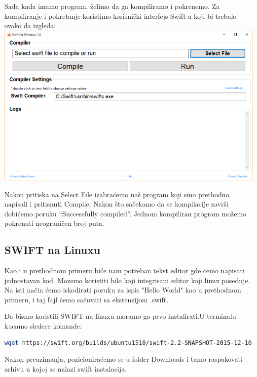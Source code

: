 \documentclass[a4paper]{article}
\begin{document}
Sada kada imamo program, želimo da ga kompiliramo i pokrenemo. Za kompiliranje i pokretanje koristimo korisnički interfejs Swift-a koji bi trebalo ovako da izgleda:\\

\includegraphics[scale=0.4]{swift-win.png}
\vspace{3mm}

Nakon pritiska na Select File izabraćemo naš program koji smo prethodno napisali i pritisnuti Compile. Nakon što sačekamo da se kompilacije završi dobićemo poruku “Successfully compiled”.
Jednom kompiliran program možemo pokrenuti neograničen broj puta.

\subsection{SWIFT na Linuxu}
\label{subsec:podnaslovLinux}

Kao i u prethodnom primeru biće nam potreban tekst editor gde cemo napisati jednostavan kod.
Mozemo koristiti bilo koji integrisani editor koji linux poseduje. Na isti način ćemo iskodirati poruku za ispis "Hello World" kao u prethodnom primeru, i taj fajl ćemo sačuvati sa ekstenzijom .swift.

Da bismo koristili SWIFT na linuxu moramo ga prvo instalirati.U terminalu kucamo sledece komande:

\begin{lstlisting}[language=bash]
	wget https://swift.org/builds/ubuntu1510/swift-2.2-SNAPSHOT-2015-12-10-a/swift-2.2-SNAPSHOT-2015-12-10-a-ubuntu15.10.tar.gz

\end{lstlisting}
Nakon preuzimanja, pozicioniraćemo se u folder Downloads i tamo raspakovati arhivu u kojoj se nalazi swift instalacija.
\end{document}
